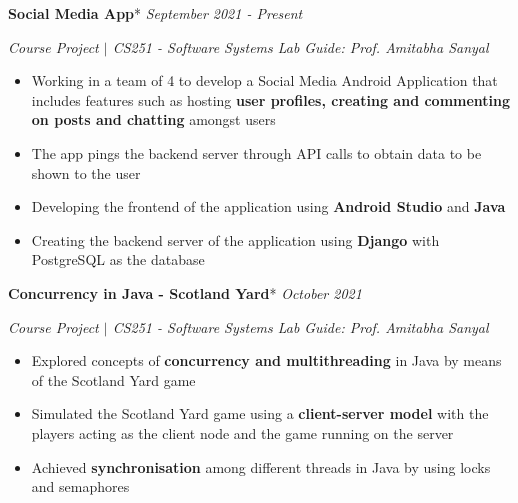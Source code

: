 \documentclass[a4paper,11pt]{article}
\begin{document}
\vspace{-4pt}
\newpage 
\textbf{\large Social Media App}*
\hfill\textit{\small September 2021 - Present}

\vspace{-1pt}
\textit{Course Project $\vert$ CS251 - Software Systems Lab}
\hfill\textit{\small Guide: Prof. Amitabha Sanyal}

\vspace{-10pt}
\begin{itemize}[itemsep = -1.0mm, leftmargin = 0.2in]
\item Working in a team of 4 to develop a Social Media Android Application that includes features such as hosting \textbf{user profiles, creating and commenting on posts and chatting} amongst users
\item The app pings the backend server through API calls to obtain data to be shown to the user
\item Developing the frontend of the application using \textbf{Android Studio} and \textbf{Java}
\item Creating the backend server of the application using \textbf{Django} with PostgreSQL as the database
\end{itemize}


\vspace{-4pt}
\textbf{\large Concurrency in Java - Scotland Yard}*
\hfill\textit{\small October 2021}

\vspace{-1pt}
\textit{Course Project $\vert$ CS251 - Software Systems Lab}
\hfill\textit{\small Guide: Prof. Amitabha Sanyal}
\vspace{-8pt}
\begin{itemize}[itemsep = -1.0mm, leftmargin = 0.2in]
\item Explored concepts of \textbf{concurrency and multithreading} in Java by means of the Scotland Yard game
\item Simulated the Scotland Yard game using a \textbf{client-server model} with the players acting as the client node and the game running on the server
\item Achieved \textbf{synchronisation} among different threads in Java by using locks and semaphores

\end{itemize}
\end{document}
